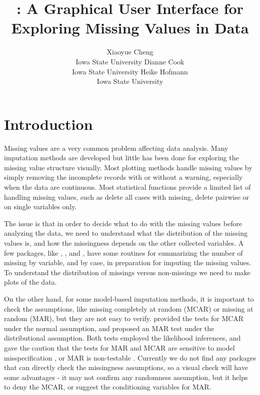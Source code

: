 \documentclass[article]{jss}
\author{Xiaoyue Cheng\\Iowa State University \And 
        Dianne Cook\\Iowa State University \And
        Heike Hofmann\\Iowa State University}
\title{\pkg{MissingDataGUI}: A Graphical User Interface for Exploring 
	Missing Values in Data}
\begin{document}
\section{Introduction}\label{introduction}

Missing values are a very common problem affecting data analysis. Many imputation methods are developed but little has been done for exploring the missing value structure visually.  Most plotting methods handle missing values by simply removing the incomplete records with or without a warning, especially when the data are continuous. Most statistical functions provide a limited list of handling missing values, such as delete all cases with missing, delete pairwise or on single variables only.

The issue is that in order to decide what to do with the missing values before analyzing the data, we need to understand what the distribution of the missing values is, and how the missingness depends on the other collected variables. A few  packages, like  \citep{hmisc},  \citep{norm}, and  \citep{mice}, have some routines for summarizing the number of missing by variable, and by case, in preparation for imputing the missing values. To understand the distribution of missings versus non-missings we need to make plots of the data.

On the other hand, for some model-based imputation methods, it is important to check the assumptions, like missing completely at random (MCAR) or missing at random (MAR), but they are not easy to verify. \citet{little1988test} provided the tests for MCAR under the normal assumption, and \citet{jaeger2006testing} proposed an MAR test under the distributional assumption. Both tests employed the likelihood inferences, and gave the caution that the tests for MAR and MCAR are sensitive to model misspecification \citep{little1988test}, or MAR is non-testable \citep{jaeger2006testing}. Currently we do not find any  packages that can directly check the missingness assumptions, so a visual check will have some advantages - it may not confirm any randomness assumption, but it helps to deny the MCAR, or suggest the conditioning variables for MAR.
\end{document}
